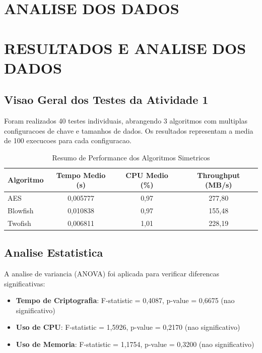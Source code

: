 \documentclass[12pt,a4paper,oneside]{article}
\begin{document}
\section{ANALISE DOS DADOS}

\section{RESULTADOS E ANALISE DOS DADOS}

\subsection{Visao Geral dos Testes da Atividade 1}

Foram realizados 40 testes individuais, abrangendo 3 algoritmos com multiplas configuracoes de chave e tamanhos de dados. Os resultados representam a media de 100 execucoes para cada configuracao.

\begin{table}[H]
\centering
\caption{Resumo de Performance dos Algoritmos Simetricos}
\label{tab:performance}
\begin{tabular}{lccc}
\toprule
\textbf{Algoritmo} & \textbf{Tempo Medio (s)} & \textbf{CPU Medio (\%)} & \textbf{Throughput (MB/s)} \\
\midrule
AES & 0,005777 & 0,97 & 277,80 \\
Blowfish & 0,010838 & 0,97 & 155,48 \\
Twofish & 0,006811 & 1,01 & 228,19 \\
\bottomrule
\end{tabular}
\end{table}

\subsection{Analise Estatistica}

A analise de variancia (ANOVA) foi aplicada para verificar diferencas significativas:

\begin{itemize}
    \item \textbf{Tempo de Criptografia}: F-statistic = 0,4087, p-value = 0,6675 (nao significativo)
    \item \textbf{Uso de CPU}: F-statistic = 1,5926, p-value = 0,2170 (nao significativo)
    \item \textbf{Uso de Memoria}: F-statistic = 1,1754, p-value = 0,3200 (nao significativo)
\end{itemize}
\end{document}
